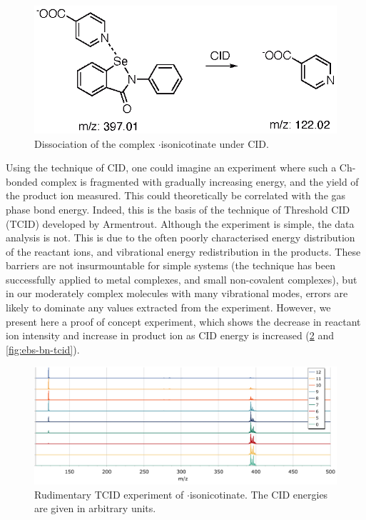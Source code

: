 \begin{refsection}
\begin{figure}
    \centering
    \includegraphics[scale=0.74]{Figures/neg-esi-ms.eps}
    \caption[Negative mode ESI of $ \cdot $isonicotinate.]{Dissociation of the complex $ \cdot $isonicotinate under CID.}\label{fig:neg-esi-ms}
\end{figure}

Using the technique of CID, one could imagine an experiment where such a Ch-bonded complex is fragmented with gradually increasing energy, and the yield of the product ion measured.
This could theoretically be correlated with the gas phase bond energy.
Indeed, this is the basis of the technique of Threshold CID (TCID) developed by Armentrout.\autocite{Armentrout2003,Rodgers2000,Narancic2007}
Although the experiment is simple, the data analysis is not.
This is due to the often poorly characterised energy distribution of the reactant ions, and vibrational energy redistribution in the products.
These barriers are not insurmountable for simple systems (the technique has been successfully applied to metal complexes, and small non-covalent complexes), but in our moderately complex molecules with many vibrational modes, errors are likely to dominate any values extracted from the experiment.
However, we present here a proof of concept experiment, which shows the decrease in reactant ion intensity and increase in product ion as CID energy is increased (\cref{fig:ebs-ph-tcid} and \cref{fig:ebs-bn-tcid}).

\begin{figure}
    \centering
    \includegraphics[width=\linewidth]{Figures/ebs-ph-cid.pdf}
    \caption[TCID experiment of $ \cdot $isonicotinate.]{Rudimentary TCID experiment of $ \cdot $isonicotinate. The CID energies are given in arbitrary units.}\label{fig:ebs-ph-tcid}
\end{figure}


\end{refsection}
